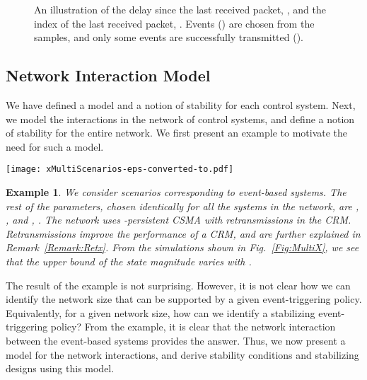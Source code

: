 \documentclass[twocolumn]{autart}
\newtheorem{example}{Example}[section]
\begin{document}
\begin{figure}[tb]
 \caption{An illustration of the delay since the last received packet, , and the index of the last received packet, . Events () are chosen from the samples, and only some events are successfully transmitted (). } \label{Fig:TimeLines}
\end{figure}

\subsection{Network Interaction Model} \label{SS:JointAnal}
We have defined a model and a notion of stability for each control system. Next, we model the interactions in the network of  control systems, and define a notion of stability for the entire network. We first present an example to motivate the need for such a model.

\begin{figure*}[tb]
\centering
\texttt{[image: xMultiScenarios-eps-converted-to.pdf]}
\caption{A comparison of the trace of the plant state  for identical plants in different sized networks; the event-triggering design appears to result in stability for small sized networks only. }
\label{Fig:MultiX}
\end{figure*}

\begin{example} \label{Ex:LMSSvisualizer}
We consider scenarios corresponding to  event-based systems. The rest of the parameters, chosen identically for all the systems in the network, are , ,  and , . The network uses -persistent CSMA with  retransmissions in the CRM. Retransmissions improve the performance of a CRM, and are further explained in Remark~\ref{Remark:Retx}. From the simulations shown in Fig.~\ref{Fig:MultiX}, we see that the upper bound of the state magnitude varies with .
\end{example}
The result of the example is not surprising. However, it is not clear how we can identify the network size that can be supported by a given event-triggering policy. Equivalently, for a given network size, how can we identify a stabilizing event-triggering policy? From the example, it is clear that the network interaction between the event-based systems provides the answer. Thus, we now present a model for the network interactions, and derive stability conditions and stabilizing designs using this model.
\end{document}
